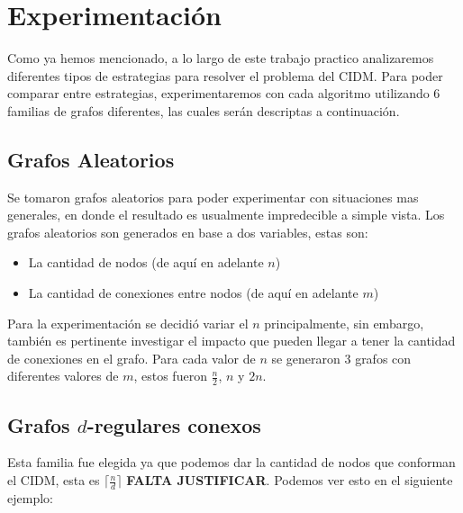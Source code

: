 \section{Experimentación}

Como ya hemos mencionado, a lo largo de este trabajo practico analizaremos diferentes tipos de estrategias para resolver el problema del CIDM. Para poder comparar entre estrategias, experimentaremos con cada algoritmo utilizando 6 familias de grafos diferentes, las cuales serán descriptas a continuación.

\subsection{Grafos Aleatorios}

Se tomaron grafos aleatorios para poder experimentar con situaciones mas generales, en donde el resultado es usualmente impredecible a simple vista. Los grafos aleatorios son generados en base a dos variables, estas son:

\begin{itemize}
	\item La cantidad de nodos (de aquí en adelante $n$)
	\item La cantidad de conexiones entre nodos (de aquí en adelante $m$)
\end{itemize}

Para la experimentación se decidió variar el $n$ principalmente, sin embargo, también es pertinente investigar el impacto que pueden llegar a tener la cantidad de conexiones en el grafo. Para cada valor de $n$ se generaron 3 grafos con diferentes valores de $m$, estos fueron $\frac{n}{2}$, $n$ y $2n$.

\subsection{Grafos $d$-regulares conexos}

Esta familia fue elegida ya que podemos dar la cantidad de nodos que conforman el CIDM, esta es $\lceil\frac{n}{d}\rceil$ \textbf{FALTA JUSTIFICAR}. Podemos ver esto en el siguiente ejemplo:

